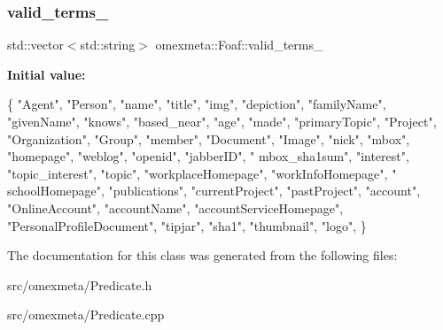 \subsubsection{\texorpdfstring{valid\+\_\+terms\+\_\+}{valid\_terms\_}}
{\footnotesize\ttfamily std\+::vector$<$std\+::string$>$ omexmeta\+::\+Foaf\+::valid\+\_\+terms\+\_\+}

{\bfseries Initial value\+:}
\begin{DoxyCode}
\{
                \textcolor{stringliteral}{"Agent"}, \textcolor{stringliteral}{"Person"}, \textcolor{stringliteral}{"name"}, \textcolor{stringliteral}{"title"}, \textcolor{stringliteral}{"img"}, \textcolor{stringliteral}{"depiction"}, \textcolor{stringliteral}{"familyName"}, \textcolor{stringliteral}{"givenName"}, \textcolor{stringliteral}{"knows"},
                \textcolor{stringliteral}{"based\_near"}, \textcolor{stringliteral}{"age"}, \textcolor{stringliteral}{"made"}, \textcolor{stringliteral}{"primaryTopic"}, \textcolor{stringliteral}{"Project"}, \textcolor{stringliteral}{"Organization"}, \textcolor{stringliteral}{"Group"}, \textcolor{stringliteral}{"member"},
                \textcolor{stringliteral}{"Document"}, \textcolor{stringliteral}{"Image"}, \textcolor{stringliteral}{"nick"}, \textcolor{stringliteral}{"mbox"}, \textcolor{stringliteral}{"homepage"}, \textcolor{stringliteral}{"weblog"}, \textcolor{stringliteral}{"openid"}, \textcolor{stringliteral}{"jabberID"}, \textcolor{stringliteral}{"
      mbox\_sha1sum"},
                \textcolor{stringliteral}{"interest"}, \textcolor{stringliteral}{"topic\_interest"}, \textcolor{stringliteral}{"topic"}, \textcolor{stringliteral}{"workplaceHomepage"}, \textcolor{stringliteral}{"workInfoHomepage"}, \textcolor{stringliteral}{"
      schoolHomepage"},
                \textcolor{stringliteral}{"publications"}, \textcolor{stringliteral}{"currentProject"}, \textcolor{stringliteral}{"pastProject"}, \textcolor{stringliteral}{"account"}, \textcolor{stringliteral}{"OnlineAccount"}, \textcolor{stringliteral}{"accountName"},
                \textcolor{stringliteral}{"accountServiceHomepage"}, \textcolor{stringliteral}{"PersonalProfileDocument"}, \textcolor{stringliteral}{"tipjar"}, \textcolor{stringliteral}{"sha1"}, \textcolor{stringliteral}{"thumbnail"}, \textcolor{stringliteral}{"logo"},
      \}
\end{DoxyCode}


The documentation for this class was generated from the following files\+:\begin{DoxyCompactItemize}
\item 
src/omexmeta/Predicate.\+h\item 
src/omexmeta/Predicate.\+cpp\end{DoxyCompactItemize}
